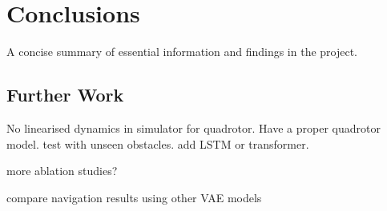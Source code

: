 \chapter{Conclusions}
\label{chap:10_conclusions}

A concise summary of essential information and findings in the project.


\section{Further Work}
\label{sec:10_further_work}

No linearised dynamics in simulator for quadrotor. 
Have a proper quadrotor model. 
test with unseen obstacles.
add LSTM or transformer.

more ablation studies?

compare navigation results using other VAE models